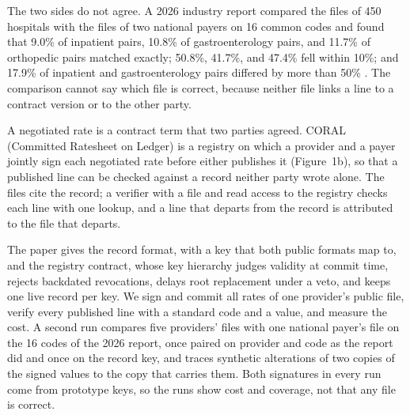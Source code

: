 \documentclass[10pt]{article}
\begin{document}
The two sides do not agree. A 2026 industry report compared the files of 450 hospitals with the files of two national payers on 16 common codes and found that 9.0\% of inpatient pairs, 10.8\% of gastroenterology pairs, and 11.7\% of orthopedic pairs matched exactly; 50.8\%, 41.7\%, and 47.4\% fell within 10\%; and 17.9\% of inpatient and gastroenterology pairs differed by more than 50\% \cite{trilliant}. The comparison cannot say which file is correct, because neither file links a line to a contract version or to the other party.

A negotiated rate is a contract term that two parties agreed. CORAL (Committed Ratesheet on Ledger) is a registry on which a provider and a payer jointly sign each negotiated rate before either publishes it (Figure~1b), so that a published line can be checked against a record neither party wrote alone. The files cite the record; a verifier with a file and read access to the registry checks each line with one lookup, and a line that departs from the record is attributed to the file that departs.

The paper gives the record format, with a key that both public formats map to, and the registry contract, whose key hierarchy judges validity at commit time, rejects backdated revocations, delays root replacement under a veto, and keeps one live record per key. We sign and commit all \sheetRecords{} rates of one provider's public file, verify every published line with a standard code and a value, and measure the cost. A second run compares five providers' files with one national payer's file on the 16 codes of the 2026 report, once paired on provider and code as the report did and once on the record key, and traces synthetic alterations of two copies of the signed values to the copy that carries them. Both signatures in every run come from prototype keys, so the runs show cost and coverage, not that any file is correct.
\end{document}
